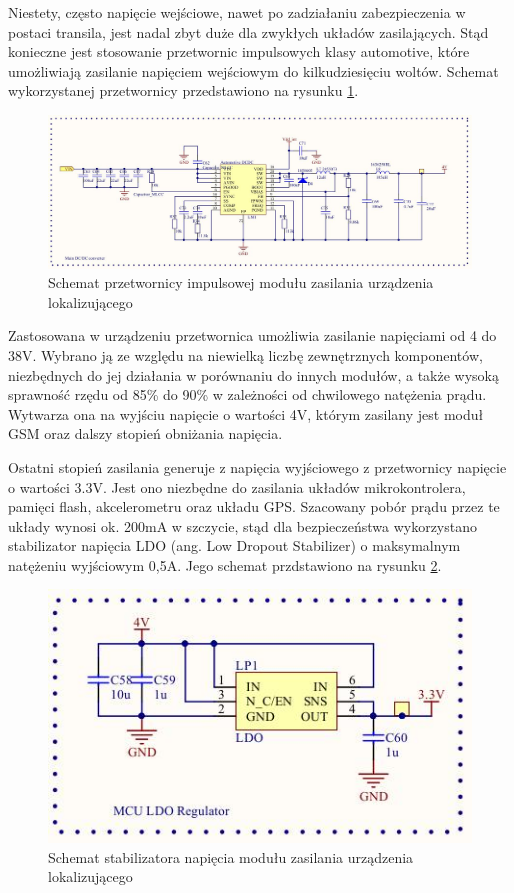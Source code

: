 Niestety, często napięcie wejściowe, nawet po zadziałaniu zabezpieczenia w postaci transila, jest nadal zbyt duże dla zwykłych układów zasilających. Stąd konieczne jest stosowanie przetwornic impulsowych klasy automotive, które umożliwiają zasilanie napięciem wejściowym do kilkudziesięciu woltów. Schemat wykorzystanej przetwornicy przedstawiono na rysunku \ref{fig:image_mainboard_power_converter}.

\begin{figure}[H]
	\centering
	\includegraphics[width=17cm]{img/schematics/mainboard_power_converter.jpg}
	\caption{Schemat przetwornicy impulsowej modułu zasilania urządzenia lokalizującego}
	\label{fig:image_mainboard_power_converter}
\end{figure}

Zastosowana w urządzeniu przetwornica umożliwia zasilanie napięciami od 4 do 38V. Wybrano ją ze względu na niewielką liczbę zewnętrznych komponentów, niezbędnych do jej działania w porównaniu do innych modułów, a także wysoką sprawność rzędu od 85\% do 90\% w zależności od chwilowego natężenia prądu. Wytwarza ona na wyjściu napięcie o wartości 4V, którym zasilany jest moduł GSM oraz dalszy stopień obniżania napięcia.

Ostatni stopień zasilania generuje z napięcia wyjściowego z przetwornicy napięcie o wartości 3.3V. Jest ono niezbędne do zasilania układów mikrokontrolera, pamięci flash, akcelerometru oraz układu GPS. Szacowany pobór prądu przez te układy wynosi ok. 200mA w szczycie, stąd dla bezpieczeństwa wykorzystano stabilizator napięcia LDO (ang. Low Dropout Stabilizer) o maksymalnym natężeniu wyjściowym 0,5A. Jego schemat przdstawiono na rysunku \ref{fig:image_mainboard_power_ldo}.

\begin{figure}[H]
	\centering
	\includegraphics[width=12cm]{img/schematics/mainboard_power_ldo.jpg}
	\caption{Schemat stabilizatora napięcia modułu zasilania urządzenia lokalizującego}
	\label{fig:image_mainboard_power_ldo}
\end{figure}

